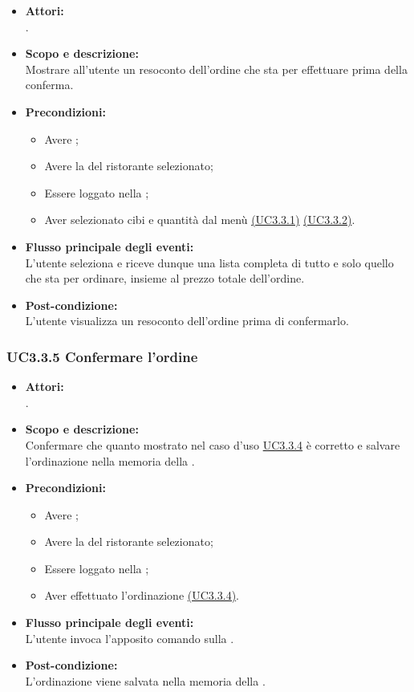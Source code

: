 \begin{itemize}
	\item \textbf{Attori:}
	\\.
	\item \textbf{Scopo e descrizione:} 
	\\Mostrare all'utente un resoconto dell'ordine che sta per effettuare prima della conferma.
	\item \textbf{Precondizioni:}
	\begin{itemize}
		\item Avere ;
		\item Avere la  del ristorante selezionato;
		\item Essere loggato nella ;
		\item Aver selezionato cibi e quantità dal menù \hyperref[UC3.3.1]{(UC3.3.1)} \hyperref[UC3.3.2]{(UC3.3.2)}.
	\end{itemize}
	\item \textbf{Flusso principale degli eventi:}
	\\L'utente seleziona  e riceve dunque una lista completa di tutto e solo quello che sta per ordinare, insieme al prezzo totale dell'ordine.
	\item \textbf{Post-condizione:}
	\\L'utente visualizza un resoconto dell'ordine prima di confermarlo.
\end{itemize}

\subsubsection{UC3.3.5 Confermare l'ordine} \label{UC3.3.5}

\begin{itemize}
	\item \textbf{Attori:}
	\\.
	\item \textbf{Scopo e descrizione:} 
	\\Confermare che quanto mostrato nel caso d'uso \hyperref[UC3.3.4]{UC3.3.4} è corretto e salvare l'ordinazione nella memoria della .
	\item \textbf{Precondizioni:}
	\begin{itemize}
		\item Avere ;
		\item Avere la  del ristorante selezionato;
		\item Essere loggato nella ;
		\item Aver effettuato l'ordinazione \hyperref[UC3.3.4]{(UC3.3.4)}.
	\end{itemize}
	\item \textbf{Flusso principale degli eventi:}
	\\L'utente invoca l'apposito comando sulla .
	\item \textbf{Post-condizione:}
	\\L'ordinazione viene salvata nella memoria della .
\end{itemize}

